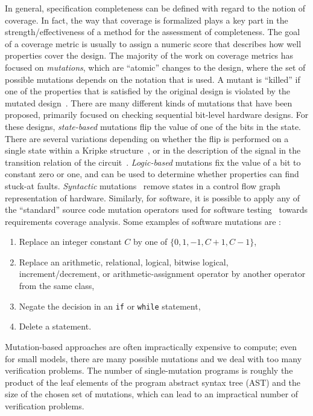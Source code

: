 In general, specification completeness can be defined with
regard to the notion of coverage. In fact, the way that coverage
is formalized plays a key part in the strength/effectiveness of
a method for the assessment of completeness. The goal of a coverage metric is usually to assign a numeric score that describes how well properties cover the design. The majority of the work on coverage metrics has focused on {\em mutations}, which are ``atomic'' changes to the design, where the set of possible mutations depends on the notation that is used.  A mutant is ``killed'' if one of the properties that is satisfied by the original design is violated by the mutated design~\cite{chockler_coverage_2003,chockler2001practical,chockler2010coverage,Kupferman:2006:SCF,kupferman_theory_2008}.  There are many different kinds of mutations that have been proposed, primarily focused on checking sequential bit-level hardware designs.  For these designs, {\em state-based} mutations flip the value of one of the bits in the state.  There are several variations depending on whether the flip is performed on a single state within a Kripke structure~\cite{hoskote1999coverage}, or in the description of the signal in the transition relation of the circuit~\cite{chockler2001practical}.  {\em Logic-based} mutations fix the value of a bit to constant zero or one, and can be used to determine whether properties can find stuck-at faults.  {\em Syntactic} mutations~\cite{chockler_coverage_2003} remove states in a control flow graph representation of hardware.  Similarly, for software, it is possible to apply any of the ``standard'' source code mutation operators used for software testing~\cite{Andrews06:mutation} towards requirements coverage analysis.  Some examples of software mutations are \cite{Budd:1980}:
\begin{enumerate}
    \item Replace an integer constant $C$ by one of $\{0, 1, -1, C + 1, C - 1\}$,
    \item Replace an arithmetic, relational, logical, bitwise logical, increment/decrement, or arithmetic-assignment operator by another operator from the same class,
    \item Negate the decision in an \texttt{if} or \texttt{while} statement,
    \item Delete a statement.
\end{enumerate}

Mutation-based approaches are often impractically expensive to compute; even for small models, there are many possible mutations and we deal with too many verification problems.  The number of single-mutation programs is roughly the product of the leaf elements of the program abstract syntax tree (AST) and the size of the chosen set of mutations, which can lead to an impractical number of verification problems.

